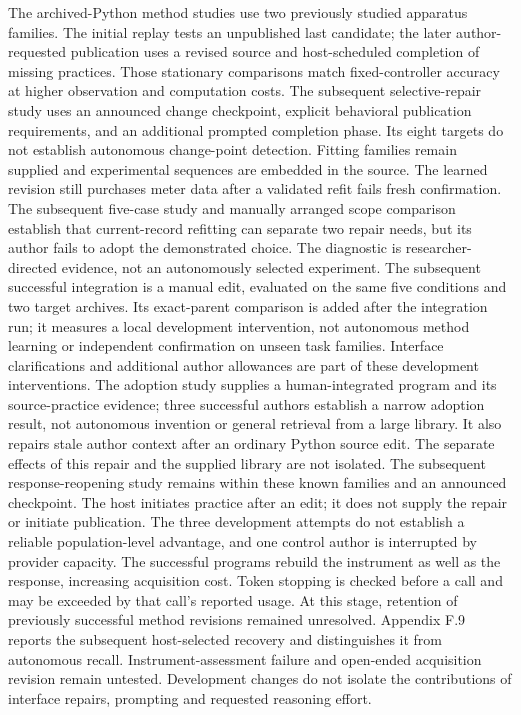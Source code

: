 \documentclass[twoside,11pt]{article}
\begin{document}
The archived-Python method studies use two previously studied apparatus families.
The initial replay tests an unpublished last candidate; the later author-requested
publication uses a revised source and host-scheduled completion of missing practices.
Those stationary comparisons match fixed-controller accuracy at higher observation
and computation costs. The subsequent selective-repair study uses an announced
change checkpoint, explicit behavioral publication requirements, and an additional
prompted completion phase. Its eight targets do not establish autonomous change-point
detection. Fitting families remain supplied and experimental sequences are embedded
in the source. The learned revision still purchases meter data after a validated
refit fails fresh confirmation. The subsequent five-case study and manually
arranged scope comparison establish that current-record refitting can separate
two repair needs, but its author fails to adopt the demonstrated choice. The
diagnostic is researcher-directed evidence, not an autonomously selected experiment.
The subsequent successful integration is a manual edit, evaluated on the same
five conditions and two target archives. Its exact-parent comparison is added
after the integration run; it measures a local development intervention, not
autonomous method learning or independent confirmation on unseen task families.
Interface clarifications and additional author allowances are part of these
development interventions. The adoption study supplies a human-integrated program
and its source-practice evidence; three successful authors establish a narrow
adoption result, not autonomous invention or general retrieval from a large library.
It also repairs stale author context after an ordinary Python source edit. The
separate effects of this repair and the supplied library are not isolated.
The subsequent response-reopening study remains within these known families and
an announced checkpoint. The host initiates practice after an edit; it does not
supply the repair or initiate publication. The three development attempts do not
establish a reliable population-level advantage, and one control author is
interrupted by provider capacity. The successful programs rebuild the instrument
as well as the response, increasing acquisition cost. Token stopping is checked
before a call and may be exceeded by that call's reported usage. At this stage, retention of
previously successful method revisions remained unresolved. Appendix F.9 reports
the subsequent host-selected recovery and distinguishes it from autonomous recall.
Instrument-assessment failure and open-ended
acquisition revision remain untested. Development changes do not isolate the
contributions of interface repairs, prompting and requested reasoning effort.
\end{document}
